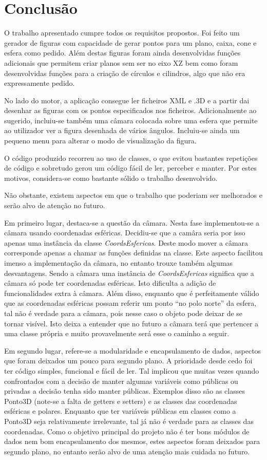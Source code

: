 \chapter{Conclusão}

O trabalho apresentado cumpre todos os requisitos propostos.
Foi feito um gerador de figuras com capacidade de gerar pontos para um plano, caixa, cone e esfera como pedido. Além destas figuras foram ainda desenvolvidas funções adicionais que permitem criar planos sem ser no eixo XZ bem como foram desenvolvidas funções para a criação de círculos e cilindros, algo que não era expressamente pedido.

No lado do motor, a aplicação consegue ler ficheiros XML e .3D e a partir dai desenhar as figuras com os pontos especificados nos ficheiros. Adicionalmente ao sugerido, incluiu-se também uma câmara colocada sobre uma esfera que permite ao utilizador ver a figura desenhada de vários ângulos. Incluiu-se ainda um pequeno menu para alterar o modo de visualização da figura.

O código produzido recorreu ao uso de classes, o que evitou bastantes repetições de código e sobretudo gerou um código fácil de ler, perceber e manter. Por estes motivos, considera-se como bastante sólido o trabalho desenvolvido.

Não obstante, existem aspectos em que o trabalho que poderiam ser melhorados e serão alvo de atenção no futuro. 

Em primeiro lugar, destaca-se a questão da câmara. Nesta fase implementou-se a câmara usando coordenadas esféricas. Decidiu-se que a camâra seria por isso apenas uma instância da classe \textit{CoordsEsfericas}. Deste modo mover a câmara corresponde apenas a chamar as funções definidas na classe. Este aspecto facilitou imenso a implementação da câmara, no entanto trouxe também algumas desvantagens. Sendo a câmara uma instância de \textit{CoordsEsfericas} significa que a câmara só pode ter coordenadas esféricas. Isto dificulta a adição de funcionalidades extra à câmara. Além disso, enquanto que é perfeitamente válido que as coordenadas esféricas possam referir um ponto ``no polo norte'' da esfera, tal não é verdade para a câmara, pois nesse caso o objeto pode deixar de se tornar visível. Isto deixa a entender que no futuro a câmara terá que pertencer a uma classe própria e muito provavelmente será esse o caminho a seguir.

Em segundo lugar, refere-se a modularidade e encapsulamento de dados, aspectos que foram deixados um pouco para segundo plano. A prioridade desde cedo foi ter código simples, funcional e fácil de ler. Tal implicou que muitas vezes quando confrontados com a decisão de manter algumas variáveis como públicas ou privadas a decisão tenha sido manter públicas. Exemplos disso são as classes Ponto3D (note-se a falta de getters e setters) e as classes das coordenadas esféricas e polares. Enquanto que ter variáveis públicas em classes como a Ponto3D seja relativamente irrelevante, tal já não é verdade para as classes das coordenadas. Como o objetivo principal do projeto não é ter bons módulos de dados nem bom encapsulamento dos mesmos, estes aspectos foram deixados para segundo plano, no entanto serão alvo de uma atenção mais cuidada no futuro.